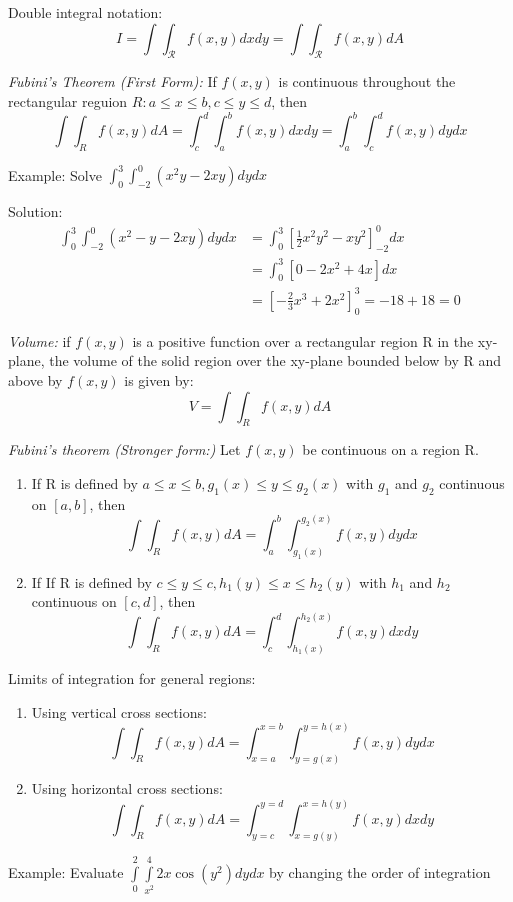 \documentclass[12pt]{article}
\begin{document}
Double integral notation:
\[I = \int \int_\mathcal{R} f(x, y) dx dy = \int \int_\mathcal{R} f(x, y) dA\]

\emph{Fubini's Theorem (First Form):}
If $f(x,y)$ is continuous throughout the rectangular reguion $R: a \leq x \leq b, c \leq y \leq d$, then 
\[\int \int_R f(x,y) dA = \int_c^d \int_a^b f(x,y) dx dy = \int_a^b \int_c^d f(x,y) dy dx\]

Example: Solve $\int_0^3 \int_{-2}^0 (x^2 y - 2xy) dy dx$

Solution:
\begin{align*}
    \int_0^3 \int_{-2}^0 (x^2 - y - 2xy) dy dx &= \int_0^3 \left[\frac{1}{2}x^2 y^2 - xy^2 \right]_{-2}^0 dx \\
    &= \int_0^3 [0 - 2x^2 + 4x] dx \\
    &= \left[-\frac{2}{3} x^3 +2x^2 \right]_0^3 = -18 + 18 = 0
\end{align*}

\emph{Volume:} if $f(x,y)$ is a positive function over a rectangular region R in the xy-plane, the volume of the solid region over the xy-plane bounded below by R and above by $f(x,y)$ is given by:
\[V = \int \int_R f(x,y) dA\]

\emph{Fubini's theorem (Stronger form:)} Let $f(x, y)$ be continuous on a region R. 
\begin{enumerate}
    \item If R is defined by $a \leq x \leq b, g_1(x) \leq y \leq g_2(x)$ with $g_1$ and $g_2$ continuous on $[a,b]$, then 
    \[\int \int_R f(x,y) dA = \int_a^b \int_{g_1(x)}^{g_2(x)} f(x, y) dy dx\]
    \item If If R is defined by $c \leq y \leq c, h_1(y) \leq x \leq h_2(y)$ with $h_1$ and $h_2$ continuous on $[c, d]$, then 
    \[\int \int_R f(x,y) dA = \int_c^d \int_{h_1(x)}^{h_2(x)} f(x, y) dx dy\]
\end{enumerate}

Limits of integration for general regions:
\begin{enumerate}
    \item Using vertical cross sections:
    \[\int \int_R f(x,y) dA = \int_{x=a}^{x=b} \int_{y=g(x)}^{y=h(x)} f(x, y) dy dx\]
    \item Using horizontal cross sections:
    \[\int \int_R f(x,y) dA = \int_{y=c}^{y=d} \int_{x=g(y)}^{x=h(y)} f(x, y) dx dy\]
\end{enumerate}
\pagebreak
Example: Evaluate $\int\limits_0^2 \int\limits_{x^2}^4 2x \cos(y^2) dy dx$ by changing the order of integration
\end{document}
